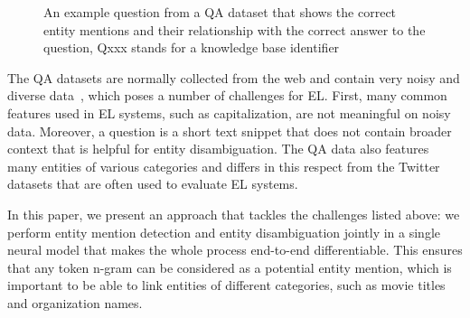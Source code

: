 \documentclass[11pt,a4paper]{article}
\newcommand{\tagroundedcorners}{0.75ex}
\newcommand{\mentiontag}[2]{\tikz[remember picture,baseline=-0.5ex]{\node [draw=none,inner sep=0.75ex,rounded corners=\tagroundedcorners,fill=cb_lightgray,minimum size=4ex,text width={}] (#2) {#1};}}
\begin{document}
\begin{figure}[t]
  \caption{An example question from a QA dataset that shows the correct entity mentions and their relationship with the correct answer to the question, {\sffamily Qxxx} stands for a knowledge base identifier 
  \label{fig:example-question}}
\end{figure}

The QA datasets are normally collected from the web and contain very noisy and diverse data~\cite{Berant2013}, which poses a number of challenges for EL. First, many common features used in EL systems, such as capitalization, are not meaningful on noisy data.
Moreover, a question is a short text snippet that does not contain broader context that is helpful for entity disambiguation. The QA data also features many entities of various categories and differs in this respect from the Twitter datasets that are often used to evaluate EL systems.

In this paper, we present an approach that tackles the challenges listed above: we perform entity mention detection and entity disambiguation jointly in a single neural model that makes the whole process end-to-end differentiable. This ensures that any token n-gram can be considered as a potential entity mention, which is important to be able to link entities of different categories, such as movie titles and organization names.
\end{document}
